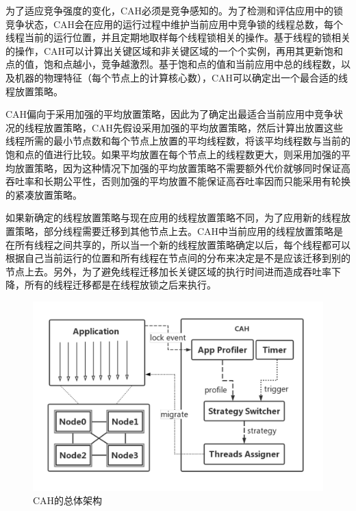 为了适应竞争强度的变化，CAH必须是竞争感知的。为了检测和评估应用中的锁竞争状态，CAH会在应用的运行过程中维护当前应用中竞争锁的线程总数，每个线程当前的运行位置，并且定期地取样每个线程锁相关的操作。基于线程的锁相关的操作，CAH可以计算出关键区域和非关键区域的一个个实例，再用其更新饱和点的值，饱和点越小，竞争越激烈。基于饱和点的值和当前应用中总的线程数，以及机器的物理特征（每个节点上的计算核心数），CAH可以确定出一个最合适的线程放置策略。

CAH偏向于采用加强的平均放置策略，因此为了确定出最适合当前应用中竞争状况的线程放置策略，CAH先假设采用加强的平均放置策略，然后计算出放置这些线程所需的最小节点数和每个节点上放置的平均线程数，将该平均线程数与当前的饱和点的值进行比较。如果平均放置在每个节点上的线程数更大，则采用加强的平均放置策略，因为这种情况下加强的平均放置策略不需要额外代价就够同时保证高吞吐率和长期公平性，否则加强的平均放置不能保证高吞吐率因而只能采用有轮换的紧凑放置策略。

如果新确定的线程放置策略与现在应用的线程放置策略不同，为了应用新的线程放置策略，部分线程需要迁移到其他节点上去。CAH中当前应用的线程放置策略是在所有线程之间共享的，所以当一个新的线程放置策略确定以后，每个线程都可以根据自己当前运行的位置和所有线程在节点间的分布来决定是不是应该迁移到别的节点上去。另外，为了避免线程迁移加长关键区域的执行时间进而造成吞吐率下降，所有的线程迁移都是在线程放锁之后来执行。

\begin{figure}[t]
	\centering
	\includegraphics[width=5.6in]{figure/architecture.pdf}
	\caption{CAH的总体架构}
	\label{Fig:archi}
\end{figure}

